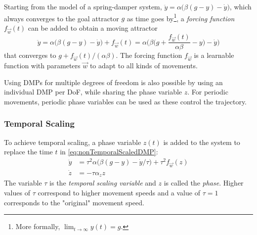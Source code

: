 			Starting from the model of a spring-damper system, \( \ddot{y} = \alpha \big( \beta (g - y) - \dot{y} \big) \), which always converges to the goal attractor \(g\) as time goes by\footnote{More formally, \( \lim_{t \to \infty} y(t) = g \).}, a \emph{forcing function} \( f_{\vec{w}}(t) \) can be added to obtain a moving attractor
			\begin{equation}
				\ddot{y} = \alpha \big( \beta (g - y) - \dot{y} \big) + f_{\vec{w}}(t) = \alpha \Bigg(\! \beta \bigg(\! g + \frac{f_{\vec{w}}(t)}{\alpha \beta} - y \!\bigg) - \dot{y} \!\Bigg)  \label{eq:nonTemporalScaledDMP}
			\end{equation}
			that converges to \( g + f_{\vec{w}}(t) / (\alpha \beta) \). The forcing function \( f_{\vec{w}} \) is a learnable function with parameters \(\vec{w}\) to adapt to all kinds of movements.

			Using DMPs for multiple degrees of freedom is also possible by using an individual DMP per DoF, while sharing the phase variable \(z\). For periodic movements, periodic phase variables can be used as these control the trajectory.

			\subsubsection{Temporal Scaling}
				To achieve temporal scaling, a phase variable \( z(t) \) is added to the system to replace the time \(t\) in \eqref{eq:nonTemporalScaledDMP}:
				\begin{align*}
					\ddot{y} &= \tau^2 \alpha \big( \beta (g - y) - \dot{y} / \tau \big) + \tau^2 f_{\vec{w}}(z) \\
					 \dot{z} &= -\tau \alpha_z z
 				\end{align*}
				The variable \(\tau\) is the \emph{temporal scaling variable} and \(z\) is called the \emph{phase}. Higher values of \(\tau\) correspond to higher movement speeds and a value of \( \tau = 1 \) corresponds to the "original" movement speed.

